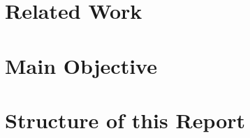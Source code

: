 

\section{Related Work}\label{sec:related}



\section{Main Objective}\label{sec:objective}


\section{Structure of this Report}\label{sec:structure}


